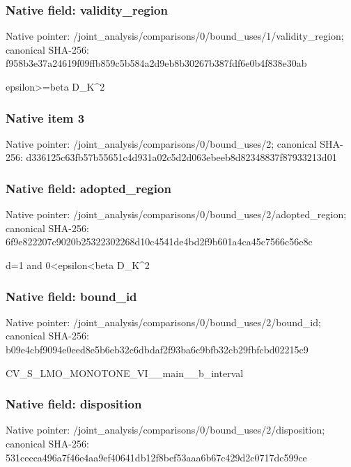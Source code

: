 \documentclass[10pt,a4paper]{article}
\begin{document}
\subsubsection{Native field: validity\_\allowbreak{}region}
Native pointer: /joint\_\allowbreak{}analysis/comparisons/0/bound\_\allowbreak{}uses/1/validity\_\allowbreak{}region; canonical SHA-256: f958b3e37a24619f09ffb859c5b584a2d9eb8b30267b387fdf6e0b4f838e30ab

\begingroup\raggedright\sloppy epsilon>=\allowbreak{}beta D\_\allowbreak{}K\textasciicircum{}2\par\endgroup

\subsubsection{Native item 3}
Native pointer: /joint\_\allowbreak{}analysis/comparisons/0/bound\_\allowbreak{}uses/2; canonical SHA-256: d336125c63fb57b55651c4d931a02c5d2d063ebeeb8d82348837f87933213d01

\subsubsection{Native field: adopted\_\allowbreak{}region}
Native pointer: /joint\_\allowbreak{}analysis/comparisons/0/bound\_\allowbreak{}uses/2/adopted\_\allowbreak{}region; canonical SHA-256: 6f9e822207c9020b25322302268d10c4541de4bd2f9b601a4ca45c7566c56e8c

\begingroup\raggedright\sloppy d=\allowbreak{}1 and 0<epsilon<beta D\_\allowbreak{}K\textasciicircum{}2\par\endgroup

\subsubsection{Native field: bound\_\allowbreak{}id}
Native pointer: /joint\_\allowbreak{}analysis/comparisons/0/bound\_\allowbreak{}uses/2/bound\_\allowbreak{}id; canonical SHA-256: b09e4cbf9094e0eed8e5b6eb32c6dbdaf2f93ba6c9bfb32cb29fbfcbd02215c9

\begingroup\raggedright\sloppy CV\_\allowbreak{}S\_\allowbreak{}LMO\_\allowbreak{}MONOTONE\_\allowbreak{}VI\_\allowbreak{}\_\allowbreak{}main\_\allowbreak{}\_\allowbreak{}b\_\allowbreak{}interval\par\endgroup

\subsubsection{Native field: disposition}
Native pointer: /joint\_\allowbreak{}analysis/comparisons/0/bound\_\allowbreak{}uses/2/disposition; canonical SHA-256: 531cecca496a7f46e4aa9ef40641db12f8bef53aaa6b67c429d2c0717dc599ce
\end{document}
